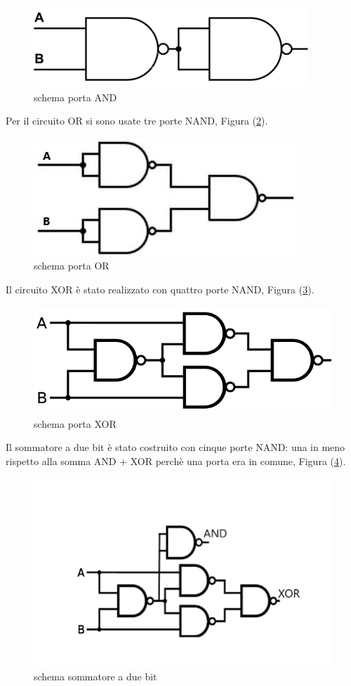 \documentclass[10pt,a4paper]{article}
\begin{document}
\begin{figure}
			\centering
			\includegraphics[scale=0.60]{and}
			\caption{schema porta AND}
			\label{fig:and}
\end{figure}
Per il circuito OR  si sono usate tre porte NAND, Figura (\ref{fig:or}).
\begin{figure}
			\centering
			\includegraphics[scale=0.85]{or}
			\caption{schema porta OR}
			\label{fig:or}
\end{figure}
Il circuito XOR  è stato realizzato con quattro porte NAND, Figura (\ref{fig:xor}).
\begin{figure}
			\centering
			\includegraphics[scale=0.55]{xor}
			\caption{schema porta XOR}
			\label{fig:xor}
\end{figure}
Il sommatore a due bit è stato costruito con cinque porte NAND: una in meno rispetto alla somma AND $+$  XOR perchè una porta era in comune, Figura (\ref{fig:som}).
\begin{figure}
			\centering
			\includegraphics[scale=0.55]{sommatore}
			\caption{schema sommatore a due bit}
			\label{fig:som}
\end{figure}
\end{document}
